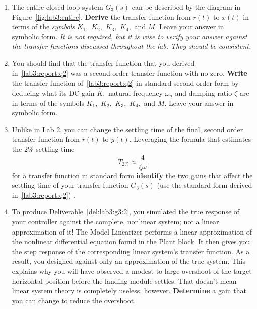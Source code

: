 \begin{deliverable}[label={lab3:report}]
  \begin{enumerate}[label={(\arabic*)}]
    \item{%
      The entire closed loop system \(G_3(s)\) can be described by the diagram in Figure~\ref{fig:lab3:entire}.
      \textbf{Derive} the transfer function from \(r(t)\) to \(x(t)\)
      in terms of the \emph{symbols} \(K_1,\) \(K_2,\) \(K_3,\) \(K_4,\) and \(M.\)
      Leave your answer in symbolic form.
      \emph{It is not required, but it is wise to verify your answer against the transfer functions discussed throughout the lab. They should be consistent.}
      \label{lab3:report:q1}
    }
    \item{%
      You should find that the transfer function that you derived in~\ref{lab3:report:q2} was a second-order transfer function with no zero.
      \textbf{Write} the transfer function of~\ref{lab3:report:q2} in standard second order form by deducing what its DC gain \(\hat{K},\) natural frequency \(\omega_n\) and damping ratio \(\zeta\) are in terms of the symbols \(K_1,\) \(K_2,\) \(K_3,\) \(K_4,\) and \(M.\)
      Leave your answer in symbolic form.
      \label{lab3:report:q2}
    }
    \item{%
      Unlike in Lab 2, you can change the settling time of the final, second order transfer function from \(r(t)\) to \(y(t).\)
      Leveraging the formula that estimates the \(2\%\) settling time
      \[
        T_{2\%} \approx \frac{4}{\zeta \omega}
      \]
      for a transfer function in standard form \textbf{identify} the two gains that affect the settling time of your transfer function \(G_3(s)\) (use the standard form derived in~\ref{lab3:report:q2}) .
      \label{lab3:report:q3}
    }
    \item{%
      To produce Deliverable~\ref{del:lab3:g3:2}, you simulated the true response of your controller against the complete, nonlinear system;
      not a linear approximation of it!
      The Model Linearizer performs a linear approximation of the nonlinear differential equation found in the Plant block.
      It then gives you the step response of the corresponding linear system's transfer function.
      As a result, you designed against only an approximation of the true system.
      This explains why you will have observed a modest to large overshoot of the target horizontal position before the landing module settles.
      That doesn't mean linear system theory is completely useless, however.
      \textbf{Determine} a gain that you can change to reduce the overshoot.
}
\end{enumerate}
\end{deliverable}
